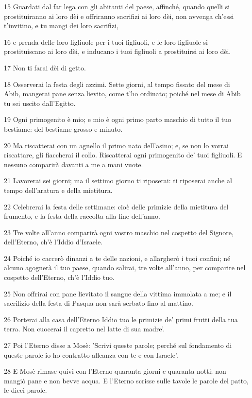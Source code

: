 \par 15 Guardati dal far lega con gli abitanti del paese, affinché, quando quelli si prostituiranno ai loro dèi e offriranno sacrifizi ai loro dèi, non avvenga ch'essi t'invitino, e tu mangi dei loro sacrifizi,
\par 16 e prenda delle loro figliuole per i tuoi figliuoli, e le loro figliuole si prostituiscano ai loro dèi, e inducano i tuoi figliuoli a prostituirsi ai loro dèi.
\par 17 Non ti farai dèi di getto.
\par 18 Osserverai la festa degli azzimi. Sette giorni, al tempo fissato del mese di Abib, mangerai pane senza lievito, come t'ho ordinato; poiché nel mese di Abib tu sei uscito dall'Egitto.
\par 19 Ogni primogenito è mio; e mio è ogni primo parto maschio di tutto il tuo bestiame: del bestiame grosso e minuto.
\par 20 Ma riscatterai con un agnello il primo nato dell'asino; e, se non lo vorrai riscattare, gli fiaccherai il collo. Riscatterai ogni primogenito de' tuoi figliuoli. E nessuno comparirà davanti a me a mani vuote.
\par 21 Lavorerai sei giorni; ma il settimo giorno ti riposerai: ti riposerai anche al tempo dell'aratura e della mietitura.
\par 22 Celebrerai la festa delle settimane: cioè delle primizie della mietitura del frumento, e la festa della raccolta alla fine dell'anno.
\par 23 Tre volte all'anno comparirà ogni vostro maschio nel cospetto del Signore, dell'Eterno, ch'è l'Iddio d'Israele.
\par 24 Poiché io caccerò dinanzi a te delle nazioni, e allargherò i tuoi confini; né alcuno agognerà il tuo paese, quando salirai, tre volte all'anno, per comparire nel cospetto dell'Eterno, ch'è l'Iddio tuo.
\par 25 Non offrirai con pane lievitato il sangue della vittima immolata a me; e il sacrifizio della festa di Pasqua non sarà serbato fino al mattino.
\par 26 Porterai alla casa dell'Eterno Iddio tuo le primizie de' primi frutti della tua terra. Non cuocerai il capretto nel latte di sua madre'.
\par 27 Poi l'Eterno disse a Mosè: 'Scrivi queste parole; perché sul fondamento di queste parole io ho contratto alleanza con te e con Israele'.
\par 28 E Mosè rimase quivi con l'Eterno quaranta giorni e quaranta notti; non mangiò pane e non bevve acqua. E l'Eterno scrisse sulle tavole le parole del patto, le dieci parole.

